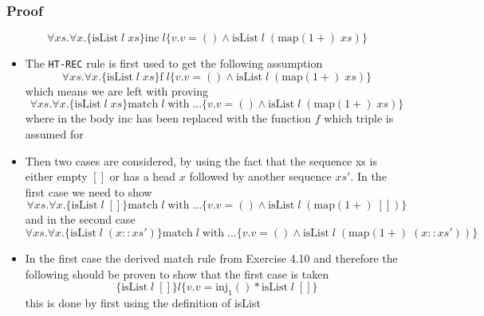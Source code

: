 \subsubsection{Proof}
\begin{equation*}
  \forall xs. \forall x. \{\text{isList} \; l \; xs \} \text{inc} \; l \{v.v = () \land \text{isList} \; l \; (\text{map}(1+) \; xs)\}
\end{equation*}
\begin{itemize}
	\item The \texttt{HT-REC} rule is first used to get the following assumption
  \begin{equation*}
    \forall xs. \forall x. \{\text{isList} \; l \; xs \} \text{f} \; l \{v.v = () \land \text{isList} \; l \; (\text{map}(1+) \; xs)\}
  \end{equation*}
  which means we are left with proving 
  \begin{equation*}
    \forall xs. \forall x. \{\text{isList} \; l \; xs \} \text{match} \; l \; \text{with} \; ... \{v.v = () \land \text{isList} \; l \; (\text{map}(1+) \; xs)\}
  \end{equation*}
  where in the body inc has been replaced with the function $f$ which triple is assumed for
  \item Then two cases are considered, by using the fact that the sequence xs is either empty $[]$ or has a head $x$ followed by another sequence $xs'$. In the first case we need to show
  \begin{equation*}
    \forall xs. \forall x. \{\text{isList} \; l \; [] \} \text{match} \; l \; \text{with} \; ... \{v.v = () \land \text{isList} \; l \; (\text{map}(1+) \; [])\}
  \end{equation*}
  and in the second case
  \begin{equation*}
    \forall xs. \forall x. \{\text{isList} \; l \; (x :: xs') \} \text{match} \; l \; \text{with} \; ... \{v.v = () \land \text{isList} \; l \; (\text{map}(1+) \; (x :: xs'))\}
  \end{equation*}
  \item In the first case the derived match rule from Exercise 4.10 and therefore the following should be proven to show that the first case is taken
  \begin{equation*}
    \{\text{isList} \; l \; []\} l \{v.v = \text{inj}_1() * \text{isList} \; l \; []\}
  \end{equation*}
  this is done by first using the definition of isList
  \begin{equation*}

\end{equation*}
\end{itemize}
